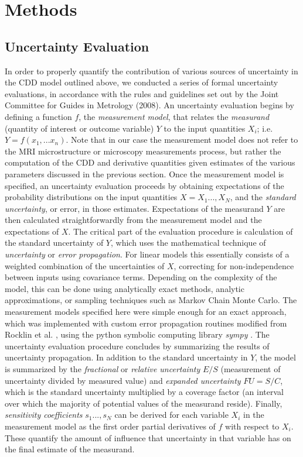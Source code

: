 
\section{Methods}

\subsection{Uncertainty Evaluation}


In order to properly quantify the contribution of various sources of uncertainty in the CDD model outlined above, we conducted a series of formal uncertainty evaluations, in accordance with the rules and guidelines set out by the Joint Committee for Guides in Metrology (2008). An uncertainty evaluation begins by defining a function $f$, the \textit{measurement model}, that relates the \textit{measurand} (quantity of interest or outcome variable) $Y$ to the input quantities $X_{i}$; i.e. $Y = f(x_{1},...x_{n})$. Note that in our case the measurement model does not refer to the MRI microstructure or microscopy measurements process, but rather the computation of the CDD and derivative quantities given estimates of the various parameters discussed in the previous section. Once the measurement model is specified,
an uncertainty evaluation proceeds by obtaining expectations of the
probability distributions on the input quantities $X=X_{1}...,X_{N}$,
and the \emph{standard uncertainty}, or error, in those estimates. Expectations of the measurand $Y$ are then calculated straightforwardly from the measurement model and the expectations of $X$. The critical
part of the evaluation procedure is calculation of the standard
uncertainty of $Y$, which uses the mathematical technique of \emph{uncertainty} or \emph{error propagation}. For linear models this essentially consists of a weighted combination of the uncertainties of $X$, correcting for non-independence between inputs using covariance terms. Depending on the complexity of the model, this can be done using
analytically exact methods, analytic approximations, or sampling techniques such as Markov Chain Monte Carlo. The measurement models specified here were simple enough for an exact approach, which was implemented with custom error propagation routines modified from Rocklin et al. \citep{rocklin2017symbolic}, using the python symbolic computing library \textit{sympy} \citep{meurer2017sympy}. The uncertainty evaluation procedure concludes by summarizing the results of uncertainty propagation. In addition to the standard uncertainty in $Y$, the model is summarized by the \emph{fractional} or \emph{relative uncertainty} $E/S$ (measurement of uncertainty divided by measured value) and \emph{expanded uncertainty} $FU=S/C$, which is the standard uncertainty multiplied by a coverage factor (an interval over which the majority of potential values of the measurand reside). Finally, \emph{sensitivity coefficients} $s_{1}...,s_{N}$ can be derived for each variable $X_{i}$ in the measurement model as the first order partial derivatives of $f$ with respect to $X_{i}$. These quantify the amount of influence that uncertainty in that variable has on the final estimate of the measurand.



